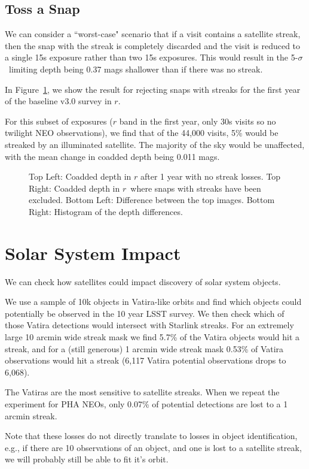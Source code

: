 \subsection{Toss a Snap}

We can consider a ``worst-case" scenario that if a visit contains a satellite streak, then the snap with the streak is completely discarded and the visit is reduced to a single 15s exposure rather than two 15s exposures. This would result in the 5-$\sigma$\ limiting depth being 0.37 mags shallower than if there was no streak.

In Figure~\ref{fig:depth_change}, we show the result for rejecting snaps with streaks for the first year of the baseline v3.0 survey in $r$. 

For this subset of exposures ($r$ band in the first year, only 30s visits so no twilight NEO observations), we find that of the 44,000 visits, 5\% would be streaked by an illuminated satellite. The majority of the sky would be unaffected, with the mean change in coadded depth being 0.011 mags. 

\begin{figure}
\caption{ Top Left: Coadded depth in $r$ after 1 year with no streak losses. Top Right: Coadded depth in $r$\ where snaps with streaks have been excluded. Bottom Left: Difference between the top images. Bottom Right: Histogram of the depth differences. \label{fig:depth_change}}
\end{figure}



\section{Solar System Impact}

We can check how satellites could impact discovery of solar system objects. 

We use a sample of 10k objects in Vatira-like orbits and find which objects could potentially be observed in the 10 year LSST survey. We then check which of those Vatira detections would intersect with Starlink streaks. For an extremely large 10 arcmin wide streak mask we find 5.7\% of the Vatira objects would hit a streak, and for a (still generous) 1 arcmin wide streak mask 0.53\% of Vatira observations would hit a streak (6,117 Vatira potential observations drops to 6,068). 

The Vatiras are the most sensitive to satellite streaks. When we repeat the experiment for PHA NEOs, only 0.07\% of potential detections are lost to a 1 arcmin streak. 

Note that these losses do not directly translate to losses in object identification, e.g., if there are 10 observations of an object, and one is lost to a satellite streak, we will probably still be able to fit it's orbit. 



